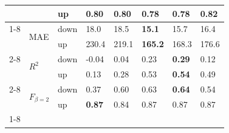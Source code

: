 \begin{table}
\begin{tabular}{llllllll}
 &  & up & 0.80 & 0.80 & 0.78 & 0.78 & \textbf{0.82} \\
\cline{1-8} \cline{2-8}
\multirow[t]{6}{*}{TransnetBW} & \multirow[t]{2}{*}{MAE} & down & 18.0 & 18.5 & \textbf{15.1} & 15.7 & 16.4 \\
 &  & up & 230.4 & 219.1 & \textbf{165.2} & 168.3 & 176.6 \\
\cline{2-8}
 & \multirow[t]{2}{*}{$R^2$} & down & -0.04 & 0.04 & 0.23 & \textbf{0.29} & 0.12 \\
 &  & up & 0.13 & 0.28 & 0.53 & \textbf{0.54} & 0.49 \\
\cline{2-8}
 & \multirow[t]{2}{*}{$F_{\beta=2}$} & down & 0.37 & 0.60 & 0.63 & \textbf{0.64} & 0.54 \\
 &  & up & \textbf{0.87} & 0.84 & 0.87 & 0.87 & 0.87 \\
\cline{1-8} \cline{2-8}
\bottomrule
\end{tabular}
\end{table}
